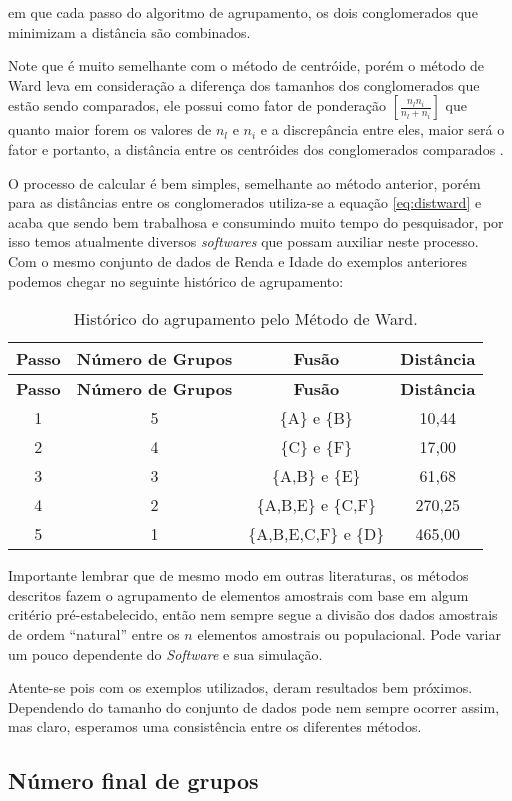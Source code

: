 \documentclass[
]{book}
\begin{document}
em que cada passo do algoritmo de agrupamento, os dois conglomerados que minimizam a distância são combinados.

Note que é muito semelhante com o método de centróide, porém o método de Ward leva em consideração a diferença dos tamanhos dos conglomerados que estão sendo comparados, ele possui como fator de ponderação \([\frac{n_l n_i}{n_l+n_i}]\) que quanto maior forem os valores de \(n_l\) e \(n_i\) e a discrepância entre eles, maior será o fator e portanto, a distância entre os centróides dos conglomerados comparados \citep{mingoti2007analise}.

O processo de calcular é bem simples, semelhante ao método anterior, porém para as distâncias entre os conglomerados utiliza-se a equação \eqref{eq:distward} e acaba que sendo bem trabalhosa e consumindo muito tempo do pesquisador, por isso temos atualmente diversos \emph{softwares} que possam auxiliar neste processo. Com o mesmo conjunto de dados de Renda e Idade do exemplos anteriores podemos chegar no seguinte histórico de agrupamento:

\begin{longtable}[]{@{}cccc@{}}
\caption{\label{tab:ligward} Histórico do agrupamento pelo Método de Ward.}\tabularnewline
\toprule
\textbf{Passo} & \textbf{Número de Grupos} & \textbf{Fusão} & \textbf{Distância}\tabularnewline
\midrule
\endfirsthead
\toprule
\textbf{Passo} & \textbf{Número de Grupos} & \textbf{Fusão} & \textbf{Distância}\tabularnewline
\midrule
\endhead
1 & 5 & \{A\} e \{B\} & 10,44\tabularnewline
2 & 4 & \{C\} e \{F\} & 17,00\tabularnewline
3 & 3 & \{A,B\} e \{E\} & 61,68\tabularnewline
4 & 2 & \{A,B,E\} e \{C,F\} & 270,25\tabularnewline
5 & 1 & \{A,B,E,C,F\} e \{D\} & 465,00\tabularnewline
\bottomrule
\end{longtable}

Importante lembrar que de mesmo modo em outras literaturas, os métodos descritos fazem o agrupamento de elementos amostrais com base em algum critério pré-estabelecido, então nem sempre segue a divisão dos dados amostrais de ordem ``natural'' entre os \(n\) elementos amostrais ou populacional. Pode variar um pouco dependente do \emph{Software} e sua simulação.

Atente-se pois com os exemplos utilizados, deram resultados bem próximos. Dependendo do tamanho do conjunto de dados pode nem sempre ocorrer assim, mas claro, esperamos uma consistência entre os diferentes métodos.

\hypertarget{nuxfamero-final-de-grupos}{%
\subsection{Número final de grupos}\label{nuxfamero-final-de-grupos}}
\end{document}
